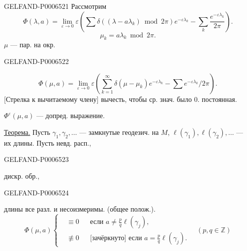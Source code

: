\begin{GelfandAdjacentEvidence}{GELFAND-P000652}{1}
Рассмотрим
\[
\Phi(\lambda,a)=\lim_{\varepsilon\to0}\varepsilon
\left(\sum\delta((\lambda-a\lambda_k)\bmod 2\pi)e^{-\varepsilon\lambda_k}
-\sum_k\frac{e^{-\varepsilon\lambda_k}}{2\pi}\right).
\]
\[
\mu_k=a\lambda_k\bmod 2\pi.
\]
\(\mu\) --- пар. на окр.
\end{GelfandAdjacentEvidence}
\begin{GelfandAdjacentEvidence}{GELFAND-P000652}{2}

\[
\Phi(\mu,a)=\lim_{\varepsilon\to0}\varepsilon
\left(\sum_{k=1}^{\infty}\delta(\mu-\mu_k)e^{-\varepsilon\lambda_k}
-\sum e^{-\varepsilon\lambda_k}/2\pi\right).
\]
[Стрелка к вычитаемому члену] вычесть, чтобы ср. знач. было \(0\). постоянная.

\(\Phi^\varepsilon(\mu,a)\) --- допред. выражение.

\underline{Теорема.} Пусть \(\gamma_1,\gamma_2,\ldots\) --- замкнутые геодезич. на \(M\),
\(\ell(\gamma_1),\ell(\gamma_2),\ldots\) --- их длины.
Пусть невд. расп.,
\end{GelfandAdjacentEvidence}
\begin{GelfandAdjacentEvidence}{GELFAND-P000652}{3}

дискр. обр.,
\end{GelfandAdjacentEvidence}
\begin{GelfandAdjacentEvidence}{GELFAND-P000652}{4}

длины все разл. и несоизмеримы. (общее полож.).
\[
\Phi(\mu,a)\left\{
\begin{aligned}
&\equiv0&&\text{если } a\ne\frac pq\ell(\gamma_j),\\
&\not\equiv0&&\text{[зачёркнуто] если } a=\frac pq\ell(\gamma_j).
\end{aligned}
\right.
\quad(p,q\in\mathbb Z)
\]
\end{GelfandAdjacentEvidence}

